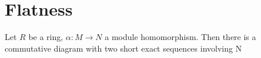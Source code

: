 \chapter{Flatness}

\begin{lmm}[9.1]
    Let \(R\) be a ring, \(\alpha: M \longrightarrow N\) a module homomorphism. Then there is a commutative diagram with two short exact sequences involving N
\end{lmm}